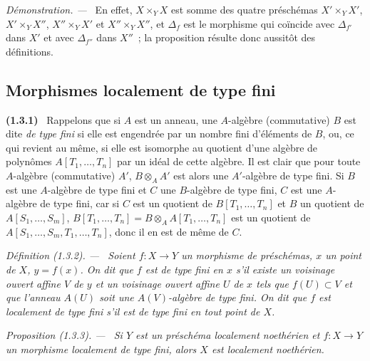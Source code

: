 \documentclass[10pt,oneside]{book}
\makeatletter
\newcommand{\setmanualcurrentlabel}[1]{\def\@currentlabel{#1}}
\newcommand{\oldpage}[2][]{%
  \setcounter{footnote}{0}%
  \marginpar{\scriptsize\textbf{#1}~|~#2}\ignorespaces}
\newenvironment{env}[1][]{\setmanualcurrentlabel{#1}\par\medskip\noindent\textbf{(#1)}\ }{\par}
\newenvironment{definition}[1][]{%
  \setmanualcurrentlabel{#1}\par\medskip\noindent\itshape Définition (#1). ---\ }{\par}
\newenvironment{proposition}[1][]{%
  \setmanualcurrentlabel{#1}\par\medskip\noindent\itshape Proposition (#1). ---\ }{\par}
\newenvironment{proof}{%
  \par\medskip\noindent\textit{Démonstration. ---\ }}{\par}
\makeatother
\begin{document}
\begin{proof}
En effet, $X\times_YX$ est somme des quatre préschémas
$X'\times_YX'$, $X'\times_YX''$, $X''\times_YX'$ et $X''\times_YX''$, et
$\Delta_f$ est le morphisme qui coïncide avec $\Delta_{f'}$ dans $X'$ et avec
$\Delta_{f''}$ dans $X''$~; la proposition résulte donc aussitôt des
définitions.
\end{proof}

\subsection{Morphismes localement de type fini}
\label{subsection:IV.1.3-fr}

\begin{env}[1.3.1]
\label{IV.1.3.1-fr}
Rappelons que si $A$ est un anneau, une $A$-algèbre (commutative) $B$ est dite
\emph{de type fini} si elle est engendrée par un nombre fini d'éléments de
$B$, ou, ce qui revient au même, si elle est isomorphe au quotient d'une
algèbre de polynômes $A[T_1,\ldots,T_n]$ par un idéal de cette algèbre. Il est
clair que pour toute $A$-algèbre (commutative) $A'$,
$B\otimes_AA'$ est alors une $A'$-algèbre de type fini. Si $B$ est une
$A$-algèbre de type fini et $C$ une $B$-algèbre de type fini, $C$ est une
$A$-algèbre de type fini, car si $C$ est un quotient de
$B[T_1,\ldots,T_n]$ et $B$ un quotient de $A[S_1,\ldots,S_m]$,
$B[T_1,\ldots,T_n]=B\otimes_AA[T_1,\ldots,T_n]$ est un quotient de
$A[S_1,\ldots,S_m,T_1,\ldots,T_n]$, donc il en est de même de $C$.
\end{env}

\begin{definition}[1.3.2]
\label{IV.1.3.2-fr}
Soient $f:X\to Y$ un morphisme de préschémas, $x$ un point de $X$,
$y=f(x)$. On dit que $f$ est \emph{de type fini en $x$} s'il existe un
voisinage ouvert affine $V$ de $y$ et un voisinage ouvert affine $U$ de $x$
tels que $f(U)\subset V$ et que l'anneau $A(U)$ soit une $A(V)$-algèbre de
type fini. On dit que $f$ est \emph{localement de type fini} s'il est de type
fini en tout point de $X$.
\end{definition}

\oldpage[IV-1]{229}

\begin{proposition}[1.3.3]
\label{IV.1.3.3-fr}
Si $Y$ est un préschéma localement noethérien et $f:X\to Y$ un morphisme
localement de type fini, alors $X$ est localement noethérien.
\end{proposition}
\end{document}
